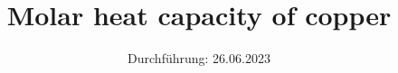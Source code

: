 

\subject{V47}
\title{Molar heat capacity of copper}
\date{
  Durchführung: 26.06.2023
}
\usepackage[aux]{rerunfilecheck}

\usepackage{fontspec}
\usepackage{siunitx}

\usepackage[ngerman]{babel}

\usepackage[unicode]{hyperref}
\usepackage{bookmark}
\usepackage{booktabs}
\usepackage{import}
\usepackage{amsmath}

\usepackage{scrhack}

\usepackage[aux]{rerunfilecheck}

\usepackage{fontspec}

\usepackage[ngerman]{babel}

\usepackage{amsmath}
\usepackage{amssymb}
\usepackage{mathtools}

\usepackage{booktabs}

\usepackage[unicode]{hyperref}
\usepackage{bookmark}
\usepackage{svg}



\maketitle
\thispagestyle{empty}
\tableofcontents
\newpage










\nocite{*}
\printbibliography

\newpage
{}



